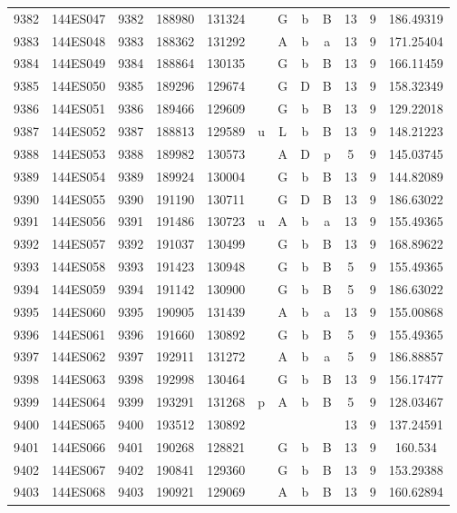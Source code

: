 \begin{tabular}{|*{12}{c|}}
9382 & 144ES047 & 9382 & 188980 & 131324 &  & G & b & B & 13 & 9 & 186.49319 \\ 
9383 & 144ES048 & 9383 & 188362 & 131292 &  & A & b & a & 13 & 9 & 171.25404 \\ 
9384 & 144ES049 & 9384 & 188864 & 130135 &  & G & b & B & 13 & 9 & 166.11459 \\ 
9385 & 144ES050 & 9385 & 189296 & 129674 &  & G & D & B & 13 & 9 & 158.32349 \\ 
9386 & 144ES051 & 9386 & 189466 & 129609 &  & G & b & B & 13 & 9 & 129.22018 \\ 
9387 & 144ES052 & 9387 & 188813 & 129589 & u & L & b & B & 13 & 9 & 148.21223 \\ 
9388 & 144ES053 & 9388 & 189982 & 130573 &  & A & D & p & 5 & 9 & 145.03745 \\ 
9389 & 144ES054 & 9389 & 189924 & 130004 &  & G & b & B & 13 & 9 & 144.82089 \\ 
9390 & 144ES055 & 9390 & 191190 & 130711 &  & G & D & B & 13 & 9 & 186.63022 \\ 
9391 & 144ES056 & 9391 & 191486 & 130723 & u & A & b & a & 13 & 9 & 155.49365 \\ 
9392 & 144ES057 & 9392 & 191037 & 130499 &  & G & b & B & 13 & 9 & 168.89622 \\ 
9393 & 144ES058 & 9393 & 191423 & 130948 &  & G & b & B & 5 & 9 & 155.49365 \\ 
9394 & 144ES059 & 9394 & 191142 & 130900 &  & G & b & B & 5 & 9 & 186.63022 \\ 
9395 & 144ES060 & 9395 & 190905 & 131439 &  & A & b & a & 13 & 9 & 155.00868 \\ 
9396 & 144ES061 & 9396 & 191660 & 130892 &  & G & b & B & 5 & 9 & 155.49365 \\ 
9397 & 144ES062 & 9397 & 192911 & 131272 &  & A & b & a & 5 & 9 & 186.88857 \\ 
9398 & 144ES063 & 9398 & 192998 & 130464 &  & G & b & B & 13 & 9 & 156.17477 \\ 
9399 & 144ES064 & 9399 & 193291 & 131268 & p & A & b & B & 5 & 9 & 128.03467 \\ 
9400 & 144ES065 & 9400 & 193512 & 130892 &  &  &  &  & 13 & 9 & 137.24591 \\ 
9401 & 144ES066 & 9401 & 190268 & 128821 &  & G & b & B & 13 & 9 & 160.534 \\ 
9402 & 144ES067 & 9402 & 190841 & 129360 &  & G & b & B & 13 & 9 & 153.29388 \\ 
9403 & 144ES068 & 9403 & 190921 & 129069 &  & A & b & B & 13 & 9 & 160.62894 \\ 

\end{tabular}
